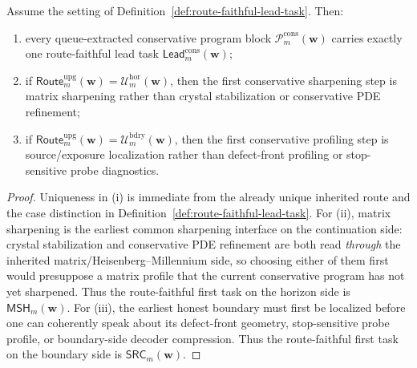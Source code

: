 \begin{proposition}
\label{prop:every-conservative-program-block-carries-exactly-one-normalized-first-task}
Assume the setting of Definition~\ref{def:route-faithful-lead-task}. Then:
\begin{enumerate}[label=(\roman*)]
 \item every queue-extracted conservative program block \(\mathcal P^{\mathrm{cons}}_{m}(\mathbf w)\) carries exactly one route-faithful lead task \(\mathsf{Lead}^{\mathrm{cons}}_{m}(\mathbf w)\);
 \item if \(\mathsf{Route}^{\mathrm{upg}}_{m}(\mathbf w)=\mathcal U^{\mathrm{hor}}_{m}(\mathbf w)\), then the first conservative sharpening step is matrix sharpening rather than crystal stabilization or conservative PDE refinement;
 \item if \(\mathsf{Route}^{\mathrm{upg}}_{m}(\mathbf w)=\mathcal U^{\mathrm{bdry}}_{m}(\mathbf w)\), then the first conservative profiling step is source/exposure localization rather than defect-front profiling or stop-sensitive probe diagnostics.
\end{enumerate}
\end{proposition}

\begin{proof}
Uniqueness in (i) is immediate from the already unique inherited route and the case distinction in Definition~\ref{def:route-faithful-lead-task}. For (ii), matrix sharpening is the earliest common sharpening interface on the continuation side: crystal stabilization and conservative PDE refinement are both read \emph{through} the inherited matrix/Heisenberg--Millennium side, so choosing either of them first would presuppose a matrix profile that the current conservative program has not yet sharpened. Thus the route-faithful first task on the horizon side is \(\mathsf{MSH}_{m}(\mathbf w)\). For (iii), the earliest honest boundary must first be localized before one can coherently speak about its defect-front geometry, stop-sensitive probe profile, or boundary-side decoder compression. Thus the route-faithful first task on the boundary side is \(\mathsf{SRC}_{m}(\mathbf w)\).
\end{proof}

